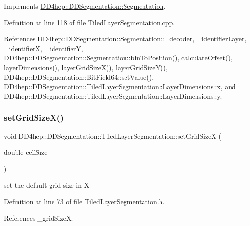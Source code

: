 Implements \hyperlink{class_d_d4hep_1_1_d_d_segmentation_1_1_segmentation_a594fe6d78667415855858d083b64acad}{D\+D4hep\+::\+D\+D\+Segmentation\+::\+Segmentation}.



Definition at line 118 of file Tiled\+Layer\+Segmentation.\+cpp.



References D\+D4hep\+::\+D\+D\+Segmentation\+::\+Segmentation\+::\+\_\+decoder, \+\_\+identifier\+Layer, \+\_\+identifierX, \+\_\+identifierY, D\+D4hep\+::\+D\+D\+Segmentation\+::\+Segmentation\+::bin\+To\+Position(), calculate\+Offset(), layer\+Dimensions(), layer\+Grid\+Size\+X(), layer\+Grid\+Size\+Y(), D\+D4hep\+::\+D\+D\+Segmentation\+::\+Bit\+Field64\+::set\+Value(), D\+D4hep\+::\+D\+D\+Segmentation\+::\+Tiled\+Layer\+Segmentation\+::\+Layer\+Dimensions\+::x, and D\+D4hep\+::\+D\+D\+Segmentation\+::\+Tiled\+Layer\+Segmentation\+::\+Layer\+Dimensions\+::y.

\hypertarget{class_d_d4hep_1_1_d_d_segmentation_1_1_tiled_layer_segmentation_aeb24630c5ce6f0510d516affa3fd798f}{}\label{class_d_d4hep_1_1_d_d_segmentation_1_1_tiled_layer_segmentation_aeb24630c5ce6f0510d516affa3fd798f} 
\subsubsection{\texorpdfstring{set\+Grid\+Size\+X()}{setGridSizeX()}}
{\footnotesize\ttfamily void D\+D4hep\+::\+D\+D\+Segmentation\+::\+Tiled\+Layer\+Segmentation\+::set\+Grid\+SizeX (\begin{DoxyParamCaption}\item[{double}]{cell\+Size }\end{DoxyParamCaption})\hspace{0.3cm}{\ttfamily [inline]}}



set the default grid size in X 



Definition at line 73 of file Tiled\+Layer\+Segmentation.\+h.



References \+\_\+grid\+SizeX.

